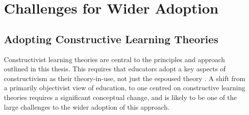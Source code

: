 












\section{Challenges for Wider Adoption} %
\label{sec:challenges_for_wider_adoption}

\subsection{Adopting Constructive Learning Theories} %
\label{sub:adopting_constructive_learning_theories}

Constructivist learning theories are central to the principles and approach outlined in this thesis. This requires that educators adopt a key aspects of constructivism as their theory-in-use, not just the espoused theory \cite{Argyris:1976}. A shift from a primarily objectivist view of education, to one centred on constructive learning theories requires a significant conceptual change, and is likely to be one of the large challenges to the wider adoption of this approach.  


